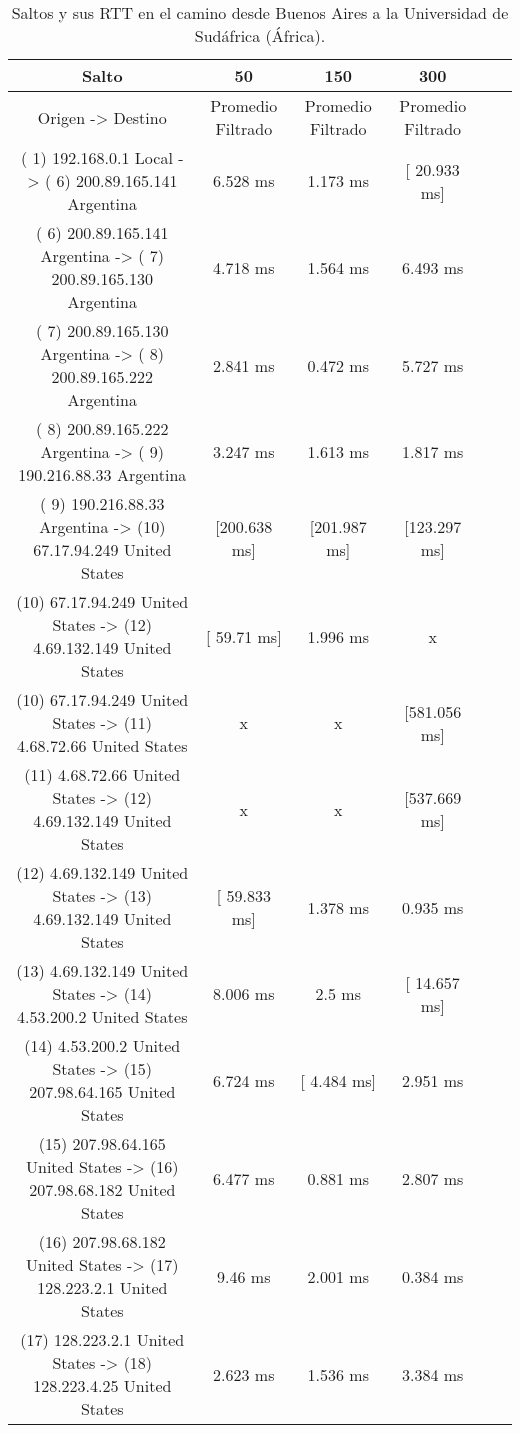 \begin{table}[]
\centering
\caption{Saltos y sus RTT en el camino desde Buenos Aires a la Universidad de Sudáfrica (África).}
\begin{tabular}{ | c | c | c | c | c | c | }
	\hline 
Salto	& 50	& 150	& 300 \\ \hline
               Origen                ->               Destino               	&Promedio Filtrado&	Promedio Filtrado&	Promedio Filtrado \\ \hline
( 1) 192.168.0.1     Local           -> ( 6) 200.89.165.141  Argentina     & 	     6.528 ms  & 	     1.173 ms   &	  [ 20.933 ms]   \\ \hline
( 6) 200.89.165.141  Argentina       -> ( 7) 200.89.165.130  Argentina     & 	     4.718 ms  & 	     1.564 ms   &	     6.493 ms    \\ \hline
( 7) 200.89.165.130  Argentina       -> ( 8) 200.89.165.222  Argentina     & 	     2.841 ms  & 	     0.472 ms   &	     5.727 ms    \\ \hline
( 8) 200.89.165.222  Argentina       -> ( 9) 190.216.88.33   Argentina     & 	     3.247 ms  & 	     1.613 ms   &	     1.817 ms    \\ \hline
( 9) 190.216.88.33   Argentina       -> (10) 67.17.94.249    United States & 	  [200.638 ms] & 	  [201.987 ms]  &	  [123.297 ms]   \\ \hline
(10) 67.17.94.249    United States   -> (12) 4.69.132.149    United States  &	  [  59.71 ms]  &	     1.996 ms    &     	x \\ \hline
(10) 67.17.94.249    United States   -> (11) 4.68.72.66      United States   &       	x      	 &           x	     &     [581.056 ms]   \\ \hline
(11) 4.68.72.66      United States   -> (12) 4.69.132.149    United States  &	       x        &   	       x	     &     [537.669 ms]   \\ \hline
(12) 4.69.132.149    United States   -> (13) 4.69.132.149    United States & 	  [ 59.833 ms] & 	     1.378 ms   &	     0.935 ms    \\ \hline
(13) 4.69.132.149    United States   -> (14) 4.53.200.2      United States & 	     8.006 ms  & 	       2.5 ms   &	  [ 14.657 ms]   \\ \hline
(14) 4.53.200.2      United States   -> (15) 207.98.64.165   United States & 	     6.724 ms  & 	  [  4.484 ms]  &	     2.951 ms    \\ \hline
(15) 207.98.64.165   United States   -> (16) 207.98.68.182   United States & 	     6.477 ms  & 	     0.881 ms   &	     2.807 ms    \\ \hline
(16) 207.98.68.182   United States   -> (17) 128.223.2.1     United States & 	      9.46 ms  & 	     2.001 ms   &	     0.384 ms    \\ \hline
(17) 128.223.2.1     United States   -> (18) 128.223.4.25    United States & 	     2.623 ms  & 	     1.536 ms   &	     3.384 ms    \\ \hline

\end{tabular}
\end{table}
